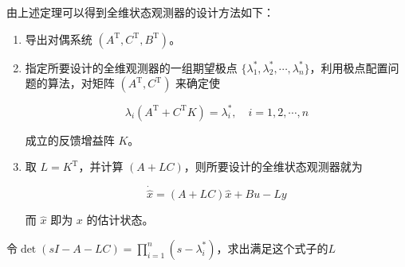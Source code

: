 由上述定理可以得到全维状态观测器的设计方法如下：
\begin{anymark}[$(A,C)$可检测条件下的全维状态观测器设计]
    \begin{enumerate}
        \item 导出对偶系统 $(A^{\mathrm{T}},C^{\mathrm{T}},B^{\mathrm{T}})$。

        \item 指定所要设计的全维观测器的一组期望极点
        $\{\lambda_1^*,\lambda_2^*,\cdots,\lambda_n^*\}$，利用极点配置问题的算法，对矩阵 $(A^{\mathrm{T}},C^{\mathrm{T}})$ 来确定使

        \[
        \lambda_i(A^{\mathrm{T}}+C^{\mathrm{T}}K)=\lambda_i^*,\quad i=1,2,\cdots,n
        \]

        成立的反馈增益阵 $K$。

        \item 取 $L=K^{\mathrm{T}}$，并计算 $(A+LC)$，则所要设计的全维状态观测器就为

        \[
        \dot{\hat{x}}=(A+LC)\hat{x}+Bu-Ly
        \]

        而 $\hat{x}$ 即为 $x$ 的估计状态。
    \end{enumerate}
\end{anymark}

\begin{anymark}[直接法设计全维状态观测器]
    令$\det(s I - A - LC) = \prod\limits_{i = 1}^n (s - \lambda_i^*)$，求出满足这个式子的$L$
\end{anymark}


